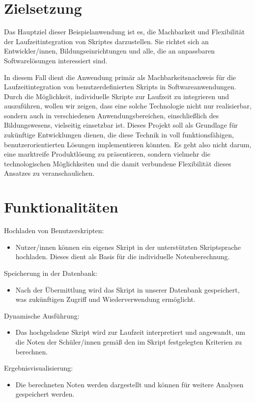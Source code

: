 \newpage
\section*{Zielsetzung}
Das Hauptziel dieser Beispielanwendung ist es, die Machbarkeit und Flexibilität der 
Laufzeitintegration von Skriptes darzustellen. Sie richtet sich an Entwickler/innen, 
Bildungseinrichtungen und alle, die an anpassbaren Softwarelösungen interessiert sind.

In diesem Fall dient die Anwendung primär als Machbarkeitsnachweis für die Laufzeitintegration 
von benutzerdefinierten Skripts in Softwareanwendungen. Durch die Möglichkeit, individuelle 
Skripte zur Laufzeit zu integrieren und auszuführen, wollen wir zeigen, dass eine solche 
Technologie nicht nur realisierbar, sondern auch in verschiedenen Anwendungsbereichen, 
einschließlich des Bildungswesens, vielseitig einsetzbar ist. Dieses Projekt soll als 
Grundlage für zukünftige Entwicklungen dienen, die diese Technik in voll funktionsfähigen, 
benutzerorientierten Lösungen implementieren könnten. Es geht also nicht darum, 
eine marktreife Produktlösung zu präsentieren, sondern vielmehr die technologischen 
Möglichkeiten und die damit verbundene Flexibilität dieses Ansatzes zu veranschaulichen.

\newpage
\section*{Funktionalitäten}

Hochladen von Benutzerskripten:
\begin{itemize}
    \item Nutzer/innen können ein eigenes Skript in der unterstützten Skriptsprache hochladen. 
    Dieses dient als Basis für die individuelle Notenberechnung.
\end{itemize}

Speicherung in der Datenbank:
\begin{itemize}
    \item Nach der Übermittlung wird das Skript in unserer Datenbank gespeichert, was zukünftigen 
    Zugriff und Wiederverwendung ermöglicht.
\end{itemize} 

Dynamische Ausführung: 
\begin{itemize}
    \item Das hochgeladene Skript wird zur Laufzeit interpretiert und angewandt, 
    um die Noten der Schüler/innen gemäß den im Skript festgelegten Kriterien zu berechnen.
\end{itemize}

Ergebnisvisualisierung: 
\begin{itemize}
    \item Die berechneten Noten werden dargestellt und können 
    für weitere Analysen gespeichert werden.
\end{itemize}

